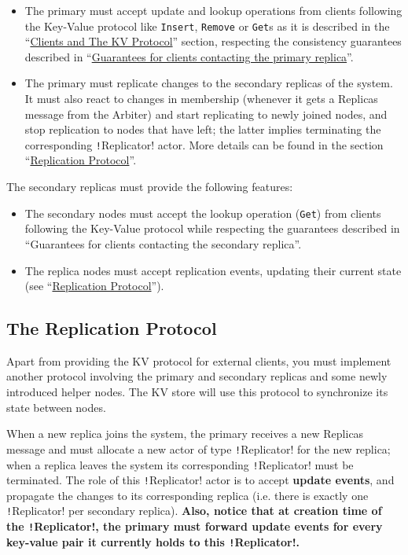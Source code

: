 \documentclass{article}
\begin{document}
\begin{itemize}
    \item The primary must accept update and lookup operations from clients following the Key-Value protocol like \texttt{Insert}, \texttt{Remove} or \texttt{Get}s as it is described in the “\hyperref[ss:clientsandkv]{Clients and The KV Protocol}” section, respecting the consistency guarantees described in “\hyperref[ss:orderingguaranteesprimary]{Guarantees for clients contacting the primary replica}”.
    \item The primary must replicate changes to the secondary replicas of the system. It must also react to changes in membership (whenever it gets a Replicas message from the Arbiter) and start replicating to newly joined nodes, and stop replication to nodes that have left; the latter implies terminating the corresponding \texttt!Replicator! actor. More details can be found in the section ``\hyperref[ss:replicationprotocol]{Replication Protocol}''.
\end{itemize}

The secondary replicas must provide the following features:

\begin{itemize}
    \item The secondary nodes must accept the lookup operation (\texttt{Get}) from clients following the Key-Value protocol while respecting the guarantees described in “Guarantees for clients contacting the secondary replica”.
    \item The replica nodes must accept replication events, updating their current state (see “\hyperref[ss:replicationprotocol]{Replication Protocol}”).
\end{itemize}

\subsection{The Replication Protocol}\label{ss:replicationprotocol}

Apart from providing the KV protocol for external clients, you must implement another protocol involving the primary and secondary replicas and some newly introduced helper nodes. The KV store will use this protocol to synchronize its state between nodes.

When a new replica joins the system, the primary receives a new Replicas message and must allocate a new actor of type \texttt!Replicator! for the new replica; when a replica leaves the system its corresponding \texttt!Replicator! must be terminated. The role of this \texttt!Replicator! actor is to accept \textbf{update events}, and propagate the changes to its corresponding replica (i.e. there is exactly one \texttt!Replicator! per secondary replica). \textbf{Also, notice that at creation time of the \texttt!Replicator!, the primary must forward update events for every key-value pair it currently holds to this \texttt!Replicator!.}
\end{document}
